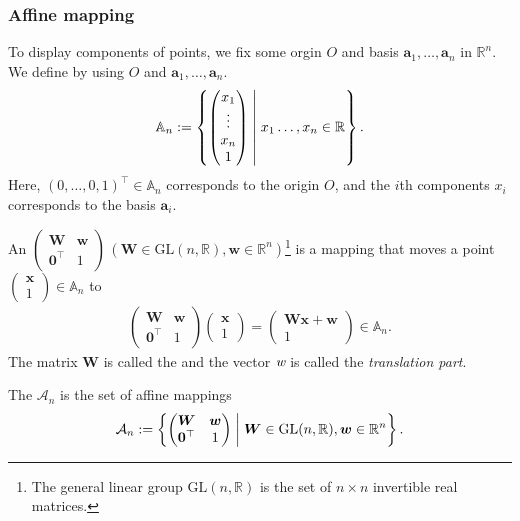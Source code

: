 \subsubsection{Affine mapping}

To display components of points, we fix some orgin $O$ and basis $\bm{a}_{1}, \dots, \bm{a}_{n}$ in $\mathbb{R}^{n}$.
We define  by using $O$ and $\bm{a}_{1}, \dots, \bm{a}_{n}$.
\begin{align}
  \mathbb{A}_{n} := \left\{  \begin{pmatrix} x_{1} \\ \vdots \\ x_{n} \\ 1 \end{pmatrix}  \mathrel{}\middle|\mathrel{}  x_{1} \dots, x_{n} \in \mathbb{R}  \right\}.
\end{align}
Here, $(0, \dots, 0, 1)^{\top} \in \mathbb{A}_{n}$ corresponds to the origin $O$, and the $i$th components $x_{i}$ corresponds to the basis $\bm{a}_{i}$.

\begin{screen}
  \begin{defn}
    An  $\begin{pmatrix} \bm{W} & \bm{w} \\ \bm{0}^{\top} & 1 \end{pmatrix} \,( \bm{W} \in \mathrm{GL}(n, \mathbb{R}), \bm{w} \in \mathbb{R}^{n} ) $\footnote{The general linear group $\mathrm{GL}(n, \mathbb{R})$ is the set of $n \times n$ invertible real matrices.} is a mapping that moves a point $ \begin{pmatrix} \bm{x} \\ 1 \end{pmatrix} \in \mathbb{A}_{n}$ to
      \begin{align}
        \begin{pmatrix} \bm{W} & \bm{w} \\ \bm{0}^{\top} & 1 \end{pmatrix} \begin{pmatrix} \bm{x} \\ 1 \end{pmatrix}
          = \begin{pmatrix} \bm{Wx} + \bm{w} \\ 1 \end{pmatrix} \in \mathbb{A}_{n}.
      \end{align}
    The matrix $\bm{W}$ is called the  and the vector $\textit{w}$ is called the \textit{translation part}.

    The  $\mathcal{A}_{n}$ is the set of affine mappings
    \begin{align}
      \mathcal{A}_{n} := \left\{  \begin{pmatrix} \bm{W} & \bm{w} \\ \bm{0}^{\top} & 1 \end{pmatrix}  \mathrel{}\middle|\mathrel{}  \bm{W} \in \mathrm{GL}(n, \mathbb{R}), \bm{w} \in \mathbb{R}^{n}  \right\}.
    \end{align}
  \end{defn}
\end{screen}


